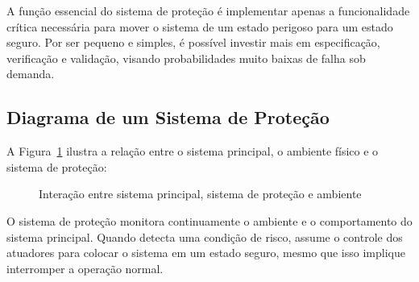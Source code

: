 \documentclass[12pt,a4paper,twoside]{report}
\begin{document}
A função essencial do sistema de proteção é implementar apenas a
funcionalidade crítica necessária para mover o sistema de um estado perigoso
para um estado seguro. Por ser pequeno e simples, é possível investir mais
em especificação, verificação e validação, visando probabilidades muito
baixas de falha sob demanda.

\subsection{Diagrama de um Sistema de Proteção}

A Figura~\ref{fig:sistema-protecao} ilustra a relação entre o sistema
principal, o ambiente físico e o sistema de proteção:

\begin{figure}[h]
    \centering
    \caption{Interação entre sistema principal, sistema de proteção e ambiente}
    \label{fig:sistema-protecao}
\end{figure}

O sistema de proteção monitora continuamente o ambiente e o comportamento do
sistema principal. Quando detecta uma condição de risco, assume o controle
dos atuadores para colocar o sistema em um estado seguro, mesmo que isso
implique interromper a operação normal.
\end{document}
